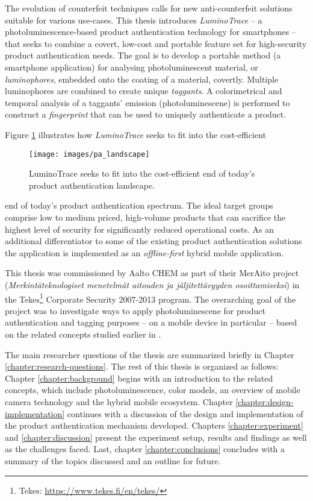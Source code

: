 \documentclass[thesis.tex]{subfiles}
\begin{document}
\enlargethispage{2\baselineskip}
The evolution of counterfeit techniques calls for new anti-counterfeit solutions suitable for various use-cases. This thesis introduces \emph{LuminoTrace} -- a photoluminescence-based product authentication technology for smartphones -- that seeks to combine a covert, low-cost and portable feature set for high-security product authentication needs. The goal is to develop a portable method (a smartphone application) for analysing photoluminescent material, or \emph{luminophores}, embedded onto the coating of a material, covertly. Multiple luminophores are combined to create unique \emph{taggants}. A colorimetrical and temporal analysis of a taggants' emission (photoluminescene) is performed to construct a \emph{fingerprint} that can be used to uniquely authenticate a product.

Figure \ref{figure:production_authentication_landscape} illustrates how \emph{LuminoTrace} seeks to fit into the cost-efficient

\begin{figure}[h!]
\centering \texttt{[image: images/pa\_landscape]}
\vspace{-8mm}
\caption{LuminoTrace seeks to fit into the cost-efficient end of today's product authentication landscape.}
\label{figure:production_authentication_landscape}
\end{figure}

\noindent end of today's product authentication spectrum. The ideal target groups comprise low to medium priced, high-volume products that can sacrifice the highest level of security for significantly reduced operational costs. As an additional differentiator to some of the existing product authentication solutions the application is implemented as an \emph{offline-first} hybrid mobile application.

This thesis was commissioned by Aalto CHEM as part of their MerAito project (\emph{Merkintäteknologiset menetelmät aitouden ja jäljitettävyyden osoittamiseksi}) in the Tekes\footnote{Tekes: \url{https://www.tekes.fi/en/tekes/}} Corporate Security 2007-2013 program. The overarching goal of the project was to investigate ways to apply photoluminescene for product authentication and tagging purposes -- on a mobile device in particular -- based on the related concepts studied earlier in \cite{kuosmanen}.

The main researcher questions of the thesis are summarized briefly in Chapter \ref{chapter:research-questions}. The rest of this thesis is organized as follows: Chapter \ref{chapter:background} begins with an introduction to the related concepts, which include photoluminescence, color models, an overview of mobile camera technology and the hybrid mobile ecosystem. Chapter \ref{chapter:design-implementation} continues with a discussion of the design and implementation of the product authentication mechanism developed. Chapters \ref{chapter:experiment} and \ref{chapter:discussion} present the experiment setup, results and findings as well as the challenges faced. Last, chapter \ref{chapter:conclusions} concludes with a summary of the topics discussed and an outline for future.
\end{document}
